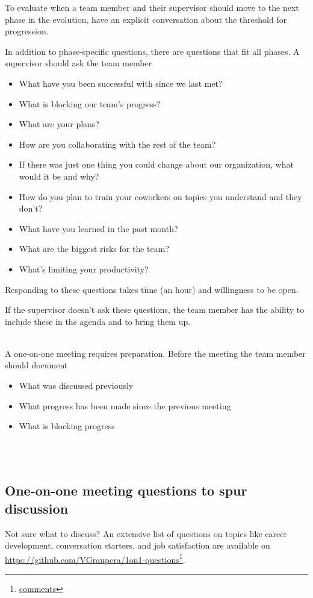 To evaluate when a team member and their supervisor should move to the next phase in the evolution, have an explicit conversation about the threshold for progression.


In addition to phase-specific questions, there are questions that fit all phases. A supervisor should ask the team member
\begin{itemize}
    \item What have you been successful with since we last met?
    \item What is blocking our team's progress?
    \item What are your plans?
    \item How are you collaborating with the rest of the team?
    \item If there was just one thing you could change about our organization, what would it be and why?
    \item How do you plan to train your coworkers on topics you understand and they don't?
    \item What have you learned in the past month?
    \item What are the biggest risks for the team?
    \item What's limiting your productivity?
\end{itemize}
Responding to these questions takes time (an hour) and willingness to be open. 

If the supervisor doesn't ask these questions, the team member has the ability to include these in the agenda and to bring them up. 


\ \\

A one-on-one meeting requires preparation. Before the meeting the team member should document
\begin{itemize}
    \item What was discussed previously
    \item What progress has been made since the previous meeting
    \item What is blocking progress
\end{itemize}


\ \\


\ \\

\subsection*{One-on-one meeting questions to spur discussion}

Not sure what to discuss? An extensive list of questions on topics like career development, conversation starters, and job satisfaction are available on \href{https://github.com/VGraupera/1on1-questions}{https://github.com/VGraupera/1on1-questions}\footnote{\href{https://news.ycombinator.com/item?id=22341138}{comments}}.
